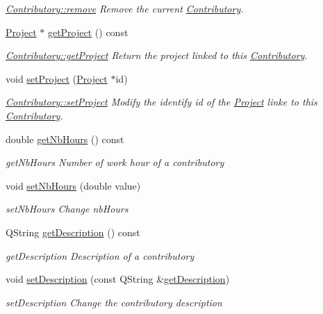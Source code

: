 \begin{DoxyCompactItemize}
\begin{DoxyCompactList}\small\item\em \hyperlink{classModels_1_1Contributory_ab9971d7867516b488095e63e1179eac8}{Contributory\+::remove} Remove the current \hyperlink{classModels_1_1Contributory}{Contributory}. \end{DoxyCompactList}\item 
\hyperlink{classModels_1_1Project}{Project} $\ast$ \hyperlink{classModels_1_1Contributory_a49379aeb4de2376d5a2aaf10f54daf05}{get\+Project} () const 
\begin{DoxyCompactList}\small\item\em \hyperlink{classModels_1_1Contributory_a49379aeb4de2376d5a2aaf10f54daf05}{Contributory\+::get\+Project} Return the project linked to this \hyperlink{classModels_1_1Contributory}{Contributory}. \end{DoxyCompactList}\item 
void \hyperlink{classModels_1_1Contributory_a4478894daf317068856b707491d03555}{set\+Project} (\hyperlink{classModels_1_1Project}{Project} $\ast$id)
\begin{DoxyCompactList}\small\item\em \hyperlink{classModels_1_1Contributory_a4478894daf317068856b707491d03555}{Contributory\+::set\+Project} Modify the identify {\itshape id} of the \hyperlink{classModels_1_1Project}{Project} linke to this \hyperlink{classModels_1_1Contributory}{Contributory}. \end{DoxyCompactList}\item 
double \hyperlink{classModels_1_1Contributory_ae85caa255441140fc1a3a0e91531bfc0}{get\+Nb\+Hours} () const 
\begin{DoxyCompactList}\small\item\em get\+Nb\+Hours Number of work hour of a contributory \end{DoxyCompactList}\item 
void \hyperlink{classModels_1_1Contributory_a1c7d65ee311232d3fd00cf8e4777f1c7}{set\+Nb\+Hours} (double value)
\begin{DoxyCompactList}\small\item\em set\+Nb\+Hours Change nb\+Hours \end{DoxyCompactList}\item 
Q\+String \hyperlink{classModels_1_1Contributory_ae2b936f2fb1ccad2009eae9b5d12fc02}{get\+Description} () const 
\begin{DoxyCompactList}\small\item\em get\+Description Description of a contributory \end{DoxyCompactList}\item 
void \hyperlink{classModels_1_1Contributory_a12d4199fa7175c0b43f62eddf7c3d69e}{set\+Description} (const Q\+String \&\hyperlink{classModels_1_1Contributory_ae2b936f2fb1ccad2009eae9b5d12fc02}{get\+Description})
\begin{DoxyCompactList}\small\item\em set\+Description Change the contributory description \end{DoxyCompactList}\end{DoxyCompactItemize}
